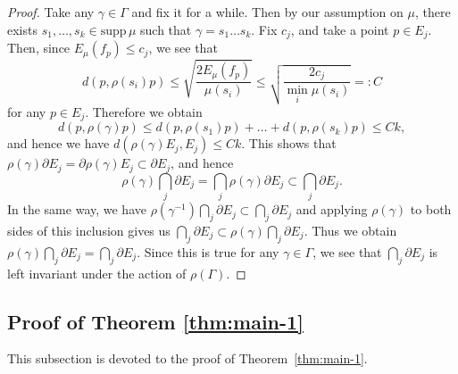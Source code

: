 \documentclass[12pt]{amsart}
\numberwithin{equation}{section}
\theoremstyle{plain}
\theoremstyle{definition}
\theoremstyle{remark}
\newcommand{\ene}[1]{E_{#1}}
\newcommand{\supp}{\mathrm{supp}\,}
\begin{document}
\begin{proof}
 Take any $\gamma \in \Gamma$ and fix it for a while.  
 Then by our assumption on $\mu$, there exists 
 $s_1, \dots, s_k \in \supp \mu$ such that $\gamma = s_1\dots s_k$. 
 Fix $c_j$,  and take a point $p \in E_j$. 
 Then, since $\ene{\mu}(f_p)\leq c_j$, we see that 
 \begin{equation*}
  d(p, \rho(s_i)p) \leq \sqrt{\frac{2\ene{\mu}(f_p)}{\mu(s_i)}}
  \leq \sqrt{\frac{2c_j}{\min_i \mu(s_i)}} =: C
 \end{equation*}
 for any $p \in E_j$. 
 Therefore we obtain
 \begin{equation*}
  d(p,\rho(\gamma)p) \leq d(p, \rho(s_1)p) + \dots + d(p,\rho(s_k)p)
   \leq Ck, 
 \end{equation*}
 and hence we have
 $d(\rho(\gamma)E_j, E_j) \leq Ck$. 
 This shows that 
 $\rho(\gamma)\partial E_j =\partial\rho(\gamma)E_j\subset\partial E_j$,
 and hence 
\begin{equation*}
 \rho(\gamma)\bigcap_j \partial E_j = \bigcap_j \rho(\gamma)\partial E_j 
  \subset \bigcap_j \partial E_j. 
\end{equation*}
 In the same way, we have 
 $\rho(\gamma^{-1})\bigcap_j \partial E_j \subset \bigcap_j\partial E_j$ 
 and applying $\rho(\gamma)$ to both sides of this inclusion gives us 
 $\bigcap_j \partial E_j \subset \rho(\gamma)\bigcap_j\partial E_j$. 
 Thus we obtain 
 $\rho(\gamma) \bigcap_j \partial E_j = \bigcap_j \partial E_j$. 
 Since this is true for any $\gamma \in \Gamma$, we see that 
 $\bigcap_j \partial E_j$ is left invariant under the action of
 $\rho(\Gamma)$. 
 \end{proof}




\subsection{Proof of Theorem \ref{thm:main-1}}
\label{sec:when-y-finite-dim}

 This subsection is devoted to the proof of Theorem~\ref{thm:main-1}.
\end{document}
